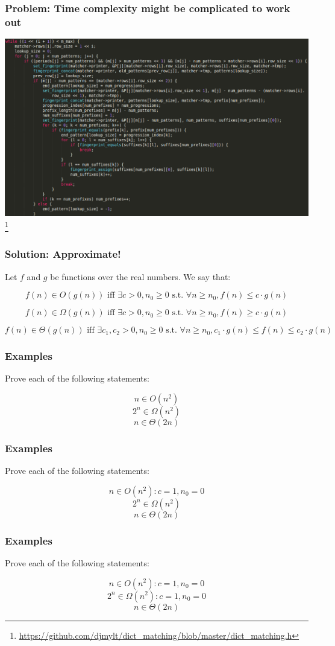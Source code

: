 \documentclass[aspectratio=169]{beamer}
\begin{document}
\begin{frame}
\frametitle{Problem: Time complexity might be complicated to work out}
\includegraphics[scale=0.25]{complex_code}\footnote{\url{https://github.com/djmylt/dict_matching/blob/master/dict_matching.h}}
\end{frame}

\begin{frame}
\frametitle{Solution: Approximate!}
Let $f$ and $g$ be functions over the real numbers. We say that:

$$f(n) \in O(g(n)) \text{ iff } \exists c > 0, n_0 \geq 0 \text{ s.t. } \forall n \geq n_0, f(n) \leq c \cdot g(n)$$

$$f(n) \in \Omega(g(n)) \text{ iff } \exists c > 0, n_0 \geq 0 \text{ s.t. } \forall n \geq n_0, f(n) \geq c \cdot g(n)$$

$$f(n) \in \Theta(g(n)) \text{ iff } \exists c_1, c_2 > 0, n_0 \geq 0 \text{ s.t. } \forall n \geq n_0, c_1 \cdot g(n) \leq f(n) \leq c_2 \cdot g(n)$$
\end{frame}

\begin{frame}
\frametitle{Examples}
Prove each of the following statements:

$$n \in O(n^2)$$
$$2^n \in \Omega(n^2)$$
$$n \in \Theta(2n)$$
\end{frame}

\begin{frame}[noframenumbering]
\frametitle{Examples}
Prove each of the following statements:

$$n \in O(n^2): c = 1, n_0 = 0$$
$$2^n \in \Omega(n^2)$$
$$n \in \Theta(2n)$$
\end{frame}

\begin{frame}[noframenumbering]
\frametitle{Examples}
Prove each of the following statements:

$$n \in O(n^2): c = 1, n_0 = 0$$
$$2^n \in \Omega(n^2): c = 1, n_0 = 0$$
$$n \in \Theta(2n)$$
\end{frame}
\end{document}
